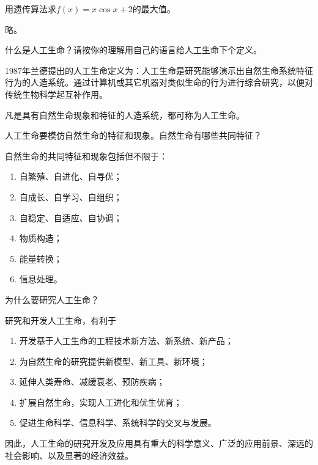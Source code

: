 \begin{question}
用遗传算法求$f(x)=x\cos x + 2$的最大值。
\end{question}
\begin{solution}
略。
\end{solution}

\begin{question}
什么是人工生命？请按你的理解用自己的语言给人工生命下个定义。
\end{question}
\begin{solution}
1987年兰德提出的人工生命定义为：人工生命是研究能够演示出自然生命系统特征行为的人造系统。通过计算机或其它机器对类似生命的行为进行综合研究，以便对传统生物科学起互补作用。\par
凡是具有自然生命现象和特征的人造系统，都可称为人工生命。
\end{solution}

\begin{question}
人工生命要模仿自然生命的特征和现象。自然生命有哪些共同特征？
\end{question}
\begin{solution}
自然生命的共同特征和现象包括但不限于：
	\begin{enumerate}
		\item 自繁殖、自进化、自寻优；
		\item 自成长、自学习、自组织；
		\item 自稳定、自适应、自协调；
		\item 物质构造；
		\item 能量转换；
		\item 信息处理。
	\end{enumerate}
\end{solution}

\begin{question}
为什么要研究人工生命？
\end{question}
\begin{solution}
研究和开发人工生命，有利于
	\begin{enumerate}
		\item 开发基于人工生命的工程技术新方法、新系统、新产品；
		\item 为自然生命的研究提供新模型、新工具、新环境；
		\item 延伸人类寿命、减缓衰老、预防疾病；
		\item 扩展自然生命，实现人工进化和优生优育；
		\item 促进生命科学、信息科学、系统科学的交叉与发展。
	\end{enumerate} \par
	因此，人工生命的研究开发及应用具有重大的科学意义、广泛的应用前景、深远的社会影响、以及显著的经济效益。
\end{solution}

